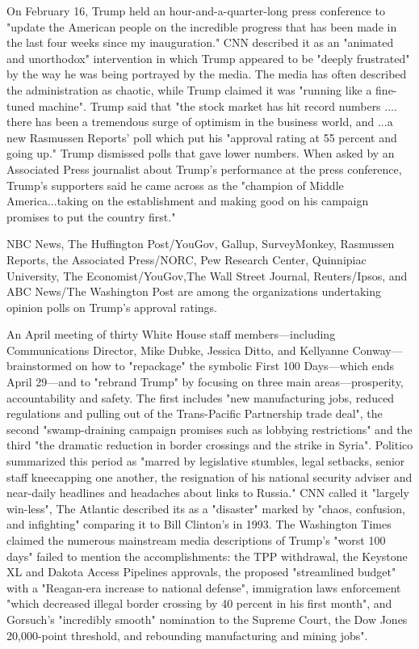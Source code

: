 On February 16, Trump held an hour-and-a-quarter-long press conference
to "update the American people on the incredible progress that has been
made in the last four weeks since my inauguration." CNN described it as
an "animated and unorthodox" intervention in which Trump appeared to be
"deeply frustrated" by the way he was being portrayed by the media. The
media has often described the administration as chaotic, while Trump
claimed it was "running like a fine-tuned machine". Trump said that "the
stock market has hit record numbers .... there has been a tremendous
surge of optimism in the business world, and ...a new Rasmussen Reports'
poll which put his "approval rating at 55 percent and going up." Trump
dismissed polls that gave lower numbers. When asked by an Associated
Press journalist about Trump's performance at the press conference,
Trump's supporters said he came across as the "champion of Middle
America...taking on the establishment and making good on his campaign
promises to put the country first."

NBC News, The Huffington Post/YouGov, Gallup, SurveyMonkey, Rasmussen
Reports, the Associated Press/NORC, Pew Research Center, Quinnipiac
University, The Economist/YouGov,The Wall Street Journal, Reuters/Ipsos,
and ABC News/The Washington Post are among the organizations undertaking
opinion polls on Trump's approval ratings.

An April meeting of thirty White House staff members---including
Communications Director, Mike Dubke, Jessica Ditto, and Kellyanne
Conway---brainstormed on how to "repackage" the symbolic First 100
Days---which ends April 29---and to "rebrand Trump" by focusing on three
main areas---prosperity, accountability and safety. The first includes
"new manufacturing jobs, reduced regulations and pulling out of the
Trans-Pacific Partnership trade deal", the second "swamp-draining
campaign promises such as lobbying restrictions" and the third "the
dramatic reduction in border crossings and the strike in Syria".
Politico summarized this period as "marred by legislative stumbles,
legal setbacks, senior staff kneecapping one another, the resignation of
his national security adviser and near-daily headlines and headaches
about links to Russia." CNN called it "largely win-less", The Atlantic
described its as a "disaster" marked by "chaos, confusion, and
infighting" comparing it to Bill Clinton's in 1993. The Washington Times
claimed the numerous mainstream media descriptions of Trump's "worst 100
days" failed to mention the accomplishments: the TPP withdrawal, the
Keystone XL and Dakota Access Pipelines approvals, the proposed
"streamlined budget" with a "Reagan-era increase to national defense",
immigration laws enforcement "which decreased illegal border crossing by
40 percent in his first month", and Gorsuch's "incredibly smooth"
nomination to the Supreme Court, the Dow Jones 20,000-point threshold,
and rebounding manufacturing and mining jobs".

